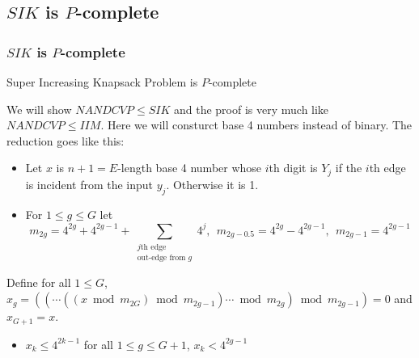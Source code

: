 \documentclass[article,8pt]{beamer}%
\begin{document}
\subsection{$SIK$ is $P$-complete}
\begin{frame}[allowframebreaks]
\frametitle{$SIK$ is $P$-complete}
\begin{theorem}
	Super Increasing Knapsack Problem is $P$-complete
\end{theorem}
We will show $NANDCVP\leq SIK$ and the proof is very much like $NANDCVP \leq IIM$. Here we will consturct base 4 numbers instead of binary. The reduction goes like this:\begin{itemize}
	\item Let $x$ is $n+1=E$-length base 4 number whose $i$th digit is $Y_j$ if the $i$th edge is incident from the input $y_j$. Otherwise it is 1.
	\item For $1\leq g\leq G$ let $$m_{2g}=4^{2g}+4^{2g-1}+\sum_{\substack{j\text{th edge}\\ \text{out-edge from }g}}4^j,\ \ m_{2g-0.5}=4^{2g}-4^{2g-1},\ \ m_{2g-1}=4^{2g-1}$$
\end{itemize}
Define for all $1\leq G$, $x_g=((\cdots ((x\bmod{m_{2G}})\bmod{m_{2g-1}})\cdots\bmod{m_{2g}})\bmod{m_{2g-1}})=0$ and $x_{G+1}=x$.
\begin{itemize}
	\item $x_k\leq 4^{2k-1}$ for all $1\leq g \leq G+1$, $x_k< 4^{2g-1}$
\end{itemize}
\framebreak


\end{frame}
\end{document}
